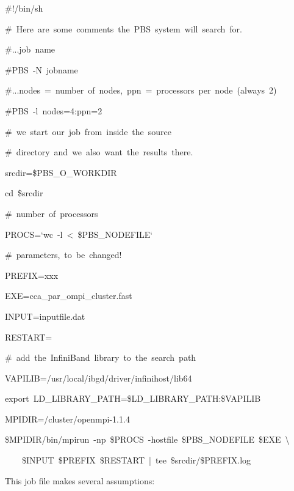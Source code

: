 \begin{lyxcode}
\#!/bin/sh

\#~Here~are~some~comments~the~PBS~system~will~search~for.

\#...job~name~

\#PBS~-N~jobname~

\#...nodes~=~number~of~nodes,~ppn~=~processors~per~node~(always~2)

\#PBS~-l~nodes=4:ppn=2



\#~we~start~our~job~from~inside~the~source

\#~directory~and~we~also~want~the~results~there.

srcdir=\$PBS\_O\_WORKDIR~

cd~\$srcdir



\#~number~of~processors

PROCS=`wc~-l~<~\$PBS\_NODEFILE`~



\#~parameters,~to~be~changed!

PREFIX=xxx~

EXE=cca\_par\_ompi\_cluster.fast

INPUT=inputfile.dat

RESTART=



\#~add~the~InfiniBand~library~to~the~search~path

VAPILIB=/usr/local/ibgd/driver/infinihost/lib64~

export~LD\_LIBRARY\_PATH=\$LD\_LIBRARY\_PATH:\$VAPILIB



MPIDIR=/cluster/openmpi-1.1.4



\$MPIDIR/bin/mpirun~-np~\$PROCS~-hostfile~\$PBS\_NODEFILE~\$EXE~\textbackslash

~~~~\$INPUT~\$PREFIX~\$RESTART~|~tee~\$srcdir/\$PREFIX.log


\end{lyxcode}
This job file makes several assumptions:

